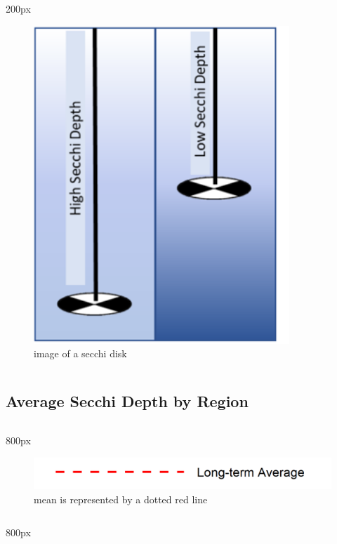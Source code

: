 \documentclass[
]{book}
\begin{document}
\begin{column}{200px\textwidth}
\begin{figure}

{\centering \includegraphics[width=3.79in]{figures/secchidisc} 

}

\caption{image of a secchi disk}\label{fig:unnamed-chunk-49}
\end{figure}
\end{column}

\hypertarget{average-secchi-depth-by-region-1}{%
\subsection{Average Secchi Depth by Region}\label{average-secchi-depth-by-region-1}}

\begin{column}{800px\textwidth}
\begin{figure}
\includegraphics[width=15.25in]{figures/mline} \caption{mean is represented by a dotted red line}\label{fig:unnamed-chunk-50}
\end{figure}
\end{column}

\begin{column}{800px\textwidth}
\end{column}
\end{document}
